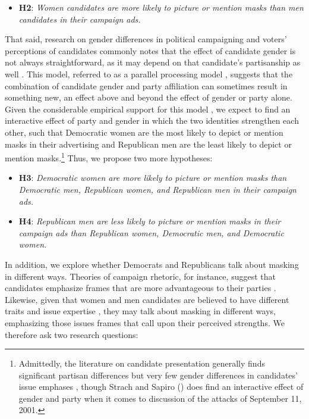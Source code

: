 \begin{itemize}
\item[]
\textbf{H2}: \textit{Women candidates are more likely to picture or mention masks than men candidates in their campaign ads.}
\end{itemize}

That said, research on gender differences in political campaigning and voters' perceptions of candidates commonly notes that the effect of candidate gender is not always straightforward, as it may depend on that candidate's partisanship as well \parencite{king2003sex, huddy2002gender}. This model, referred to as a parallel processing model \parencite{schneider2016interplay}, suggests that the combination of candidate gender and party affiliation can sometimes result in something new, an effect above and beyond the effect of gender or party alone. Given the considerable empirical support for this model \parencite{schneider2016interplay}, we
expect to find an interactive effect of party and gender in which the two identities strengthen each other, such that Democratic women are the most likely to depict or mention masks in their advertising and Republican men are the least likely to depict or mention masks.\footnote{Admittedly, the literature on candidate presentation generally finds significant partisan differences but very few gender differences in candidates' issue emphases \parencite{dolan2017candidates, sapiro2011gender}, though Strach and Sapiro (\citeyear{strach2011campaigning}) does find an interactive effect of gender and party when it comes to discussion of the attacks of September 11, 2001.}  Thus, we propose two more hypotheses:

\begin{itemize}
\item[]
\textbf{H3}: \textit{Democratic women are more likely to picture or mention masks than Democratic men, Republican women, and Republican men in their campaign ads.}

\item[]
\textbf{H4}: \textit{Republican men are less likely to picture or mention masks in their campaign ads than Republican women, Democratic men, and Democratic women.}
\end{itemize}

In addition, we explore whether Democrats and Republicans talk about masking in different ways.  Theories of campaign rhetoric, for instance, suggest that candidates emphasize frames that are more advantageous to their parties \parencite{sides2006origins}. Likewise, given that women and men candidates are believed to have different traits and issue expertise \parencite{huddy1993gender}, they may talk about masking in different ways, emphasizing those issues frames that call upon their perceived strengths. We therefore ask two research questions:

